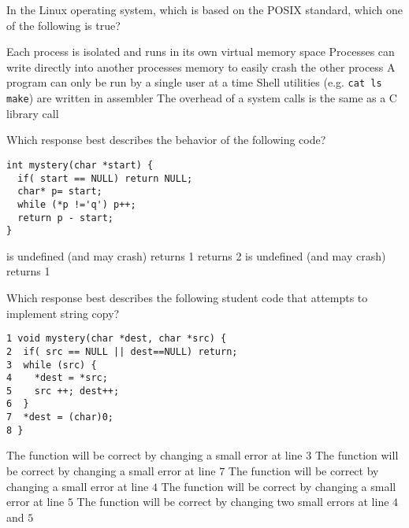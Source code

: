 \variant
In the Linux operating system, which is based on the POSIX standard, which one of the following is true?
\begin{answers}
\correctanswer  Each process is isolated and runs in its own virtual memory space
\answer  Processes can write directly into another processes memory to easily crash the other process
\answer  A program can only be run by a single user at a time
\answer Shell utilities (e.g. {\tt cat ls make}) are written in assembler
\answer  The overhead of a system calls is the same as a C library call
\end{answers}
\begin{solution}
\end{solution}



\variant
Which response best describes the behavior of the following code?
\begin{verbatim}
int mystery(char *start) {
  if( start == NULL) return NULL;
  char* p= start;
  while (*p !='q') p++;
  return p - start;
}
\end{verbatim}
\begin{answers}
 is undefined (and may crash)
 returns 1
 returns 2
  is undefined (and may crash)
  returns 1
\end{answers}
\begin{solution}
\end{solution}


\variant
Which response best describes the following student code that attempts to implement string copy?
\begin{verbatim}
1 void mystery(char *dest, char *src) {
2  if( src == NULL || dest==NULL) return;
3  while (src) { 
4    *dest = *src; 
5    src ++; dest++;
6  } 
7  *dest = (char)0;
8 }
\end{verbatim}
\begin{answers}
\correctanswer  The function will be correct by changing a small error at line $3$
\answer  The function will be correct by changing a small error at line $7$
\answer  The function will be correct by changing a small error at line $4$
\answer  The function will be correct by changing a small error at line $5$
\answer  The function will be correct by changing two small errors at line $4$ and $5$
\end{answers}
\begin{solution}
\end{solution}

